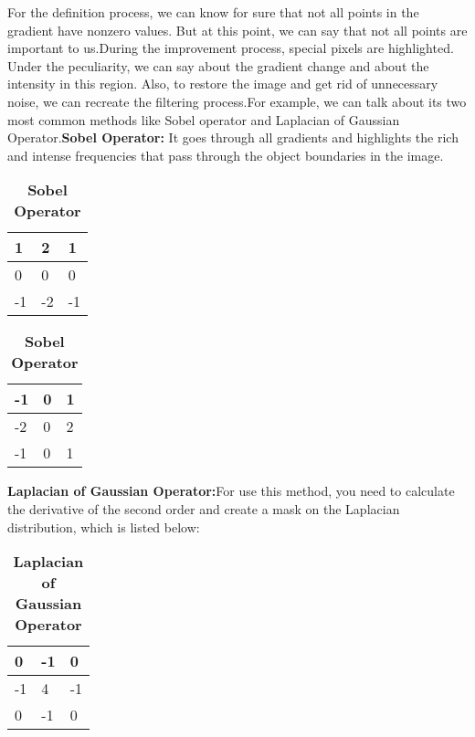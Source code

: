 \par  For the definition process, we can know for sure that not all points in the gradient have nonzero values. But at this point, we can say that not all points are important to us.During the improvement process, special pixels are highlighted. Under the peculiarity, we can say about the gradient change and about the intensity in this region. Also, to restore the image and get rid of unnecessary noise, we can recreate the filtering process.For example, we can talk about its two most common methods like Sobel operator and Laplacian of Gaussian Operator.\textbf{Sobel Operator:}
It goes through all gradients and highlights the rich and intense frequencies that pass through the object boundaries in the image.
\begin{table}[!htb]
	\caption{\textbf{Sobel Operator}}
	\begin{minipage}{.5\linewidth}
		\centering
		\begin{tabular}{|l|l|l|} \hline
			1 & 2 & 1 \\ \hline
			0 & 0 & 0 \\ \hline
			-1 & -2 & -1 \\ \hline
		\end{tabular}
	\end{minipage}%
	\begin{minipage}{.5\linewidth}
		\centering
		\begin{tabular}{|l|l|l|} \hline
			-1 & 0 & 1 \\ \hline
			-2 & 0 & 2 \\ \hline
			-1 & 0 & 1 \\ \hline
		\end{tabular}
	\end{minipage} 
\end{table}

\textbf{Laplacian of Gaussian Operator:}For use this method, you need to calculate the derivative of the second order and create a mask on the Laplacian distribution, which is listed below:
\begin{table}[!htb]
	\caption{\textbf{Laplacian of Gaussian Operator}}
	\centering
	\vspace{0.3cm}
	\begin{tabular}{|l|l|l|} \hline
		0 & -1 & 0 \\ \hline
		-1 & 4 & -1 \\ \hline
		0 & -1 & 0 \\ \hline
	\end{tabular} 
\end{table}

